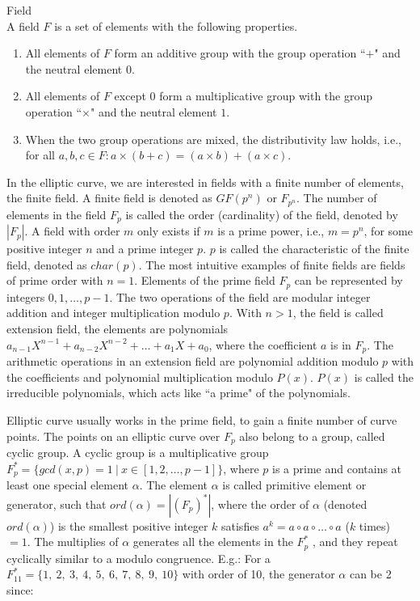 \begin{mdframed}[align=center, userdefinedwidth=32em]
    \begin{definition} Field\\
    A field $F$ is a set of elements with the following properties.
    \begin{enumerate}
      \item All elements of $F$ form an additive group with the group operation ``$+$" and the neutral element $0$.
      \item All elements of $F$ except $0$ form a multiplicative group with the group operation ``$\times$" and the neutral element $1$.
      \item When the two group operations are mixed, the distributivity law holds, i.e., for all $a, b, c \in F: a \times (b+c) = (a \times b) + (a \times c)$.
    \end{enumerate}
    \end{definition}
\end{mdframed}

In the elliptic curve, we are interested in fields with a finite number of elements, the finite field. A finite field is denoted as $GF(p^n)$ or $F_{p^n}$. The number of elements in the field $F_p$ is called the order (cardinality) of the field, denoted by $|F_p|$. A field with order $m$ only exists if $m$ is a prime power, i.e., $m = p^n$, for some positive integer $n$ and a prime integer $p$. $p$ is called the characteristic of the finite field, denoted as $char(p)$. The most intuitive examples of finite fields are fields of prime order with $n = 1$. Elements of the prime field $F_p$ can be represented by integers $0, 1, \dotso , p-1$. The two operations of the field are modular integer addition and integer multiplication modulo $p$. With $n > 1$, the field is called extension field, the elements are polynomials $a_{n-1}X^{n-1} + a_{n-2}X^{n-2} + \dotso + a_1X + a_0$, where the coefficient $a$ is in $F_p$. The arithmetic operations in an extension field are polynomial addition modulo $p$ with the coefficients and polynomial multiplication modulo $P(x)$. $P(x)$ is called the irreducible polynomials, which acts like ``a prime" of the polynomials.

Elliptic curve usually works in the prime field, to gain a finite number of curve points. The points on an elliptic curve over $F_p$ also belong to a group, called cyclic group. A cyclic group is a multiplicative group $F_p^* = \{ gcd(x,p) = 1 \ | \ x \in [ 1, 2, \dotso , p-1 ] \}$, where $p$ is a prime and contains at least one special element $\alpha$. The element $\alpha$ is called primitive element or generator, such that $ord(\alpha) = |(F_p)^*|$, where the order of $\alpha$ (denoted $ord(\alpha)$) is the smallest positive integer $k$ satisfies $a^k = a \circ a \circ \dotso \circ a$ ($k$ times) $= 1$. The multiplies of $\alpha$ generates all the elements in the $F_p^*$ , and they repeat cyclically similar to a modulo congruence. E.g.: For a $F_{11}^* = \{ 1, \ 2, \ 3, \ 4, \ 5, \ 6, \ 7, \ 8, \ 9, \ 10 \}$ with order of 10, the generator $\alpha$ can be 2 since:\\


